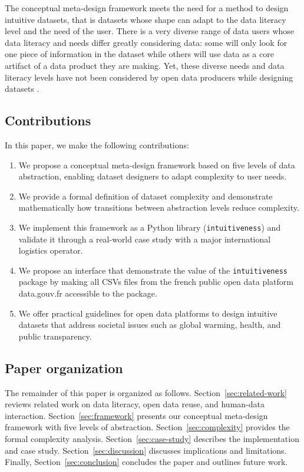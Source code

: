 \documentclass[Afour,times,sageh]{sagej}
\begin{document}
The conceptual meta-design framework meets the need for a method to design intuitive datasets, that is datasets whose shape can adapt to the data literacy level and the need of the user. There is a very diverse range of data users whose data literacy and needs differ greatly considering data: some will only look for one piece of information in the dataset while others will use data as a core artifact of a data product they are making. Yet, these diverse needs and data literacy levels have not been considered by open data producers while designing datasets \citep{dymytrova2018}.

\subsection{Contributions}

In this paper, we make the following contributions:
\begin{enumerate}
    \item We propose a conceptual meta-design framework based on five levels of data abstraction, enabling dataset designers to adapt complexity to user needs.
    \item We provide a formal definition of dataset complexity and demonstrate mathematically how transitions between abstraction levels reduce complexity.
    \item We implement this framework as a Python library (\texttt{intuitiveness}) and validate it through a real-world case study with a major international logistics operator.
    \item We propose an interface that demonstrate the value of the \texttt{intuitiveness} package by making all CSVs files from the french public open data platform data.gouv.fr accessible to the package. 
    \item We offer practical guidelines for open data platforms to design intuitive datasets that address societal issues such as global warming, health, and public transparency.
\end{enumerate}

\subsection{Paper organization}

The remainder of this paper is organized as follows. Section~\ref{sec:related-work} reviews related work on data literacy, open data reuse, and human-data interaction. Section~\ref{sec:framework} presents our conceptual meta-design framework with five levels of abstraction. Section~\ref{sec:complexity} provides the formal complexity analysis. Section~\ref{sec:case-study} describes the implementation and case study. Section~\ref{sec:discussion} discusses implications and limitations. Finally, Section~\ref{sec:conclusion} concludes the paper and outlines future work.
\end{document}
